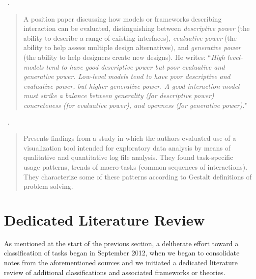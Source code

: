 \begin{sloppypar}
~\cite{Beaudouin-Lafon2004}. \end{sloppypar}

\begin{quotation}
    A position paper discussing how models or frameworks describing interaction can be evaluated, distinguishing between {\it descriptive power} (the ability to describe a range of existing interfaces), {\it evaluative power} (the ability to help assess multiple design alternatives), and {\it generative power} (the ability to help designers create new designs).
    He writes: ``{\it High level-models tend to have good descriptive power but poor evaluative and generative power. Low-level models tend to have poor descriptive and evaluative power, but higher generative power. A good interaction model must strike a balance between generality (for descriptive power) concreteness (for evaluative power), and openness (for generative power).}''
\end{quotation}

\begin{sloppypar}
~\cite{Pohl2010}. \end{sloppypar}

\begin{quotation}
    Presents findings from a study in which the authors evaluated use of a visualization tool intended for exploratory data analysis by means of qualitative and quantitative log file analysis. 
    They found task-specific usage patterns, trends of macro-tasks (common sequences of interactions). 
    They characterize some of these patterns according to Gestalt definitions of problem solving. 
\end{quotation}



\section{Dedicated Literature Review}
\label{app:typology:chronology:dedicated}


As mentioned at the start of the previous section, a deliberate effort toward a classification of tasks began in September 2012, when we began to consolidate notes from the aforementioned sources and we initiated a dedicated literature review of additional classifications and associated frameworks or theories.

